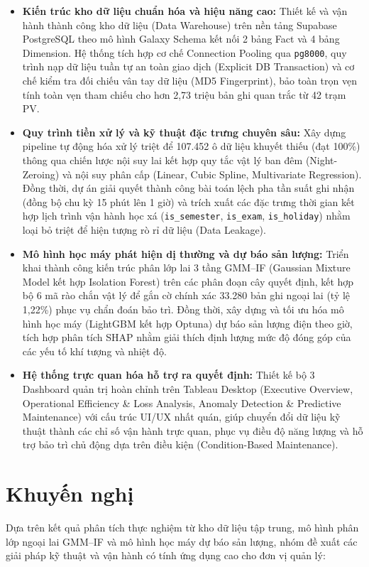 \documentclass[12pt, a4paper]{report}
\begin{document}
\begin{itemize}
    \item \textbf{Kiến trúc kho dữ liệu chuẩn hóa và hiệu năng cao:} Thiết kế và vận hành thành công kho dữ liệu (Data Warehouse) trên nền tảng Supabase PostgreSQL theo mô hình Galaxy Schema kết nối 2 bảng Fact và 4 bảng Dimension. Hệ thống tích hợp cơ chế Connection Pooling qua \texttt{pg8000}, quy trình nạp dữ liệu tuần tự an toàn giao dịch (Explicit DB Transaction) và cơ chế kiểm tra đối chiếu vân tay dữ liệu (MD5 Fingerprint), bảo toàn trọn vẹn tính toàn vẹn tham chiếu cho hơn 2,73 triệu bản ghi quan trắc từ 42 trạm PV.
    \item \textbf{Quy trình tiền xử lý và kỹ thuật đặc trưng chuyên sâu:} Xây dựng pipeline tự động hóa xử lý triệt để 107.452 ô dữ liệu khuyết thiếu (đạt 100\%) thông qua chiến lược nội suy lai kết hợp quy tắc vật lý ban đêm (Night-Zeroing) và nội suy phân cấp (Linear, Cubic Spline, Multivariate Regression). Đồng thời, dự án giải quyết thành công bài toán lệch pha tần suất ghi nhận (đồng bộ chu kỳ 15 phút lên 1 giờ) và trích xuất các đặc trưng thời gian kết hợp lịch trình vận hành học xá (\texttt{is\_semester}, \texttt{is\_exam}, \texttt{is\_holiday}) nhằm loại bỏ triệt để hiện tượng rò rỉ dữ liệu (Data Leakage).
    \item \textbf{Mô hình học máy phát hiện dị thường và dự báo sản lượng:} Triển khai thành công kiến trúc phân lớp lai 3 tầng GMM--IF (Gaussian Mixture Model kết hợp Isolation Forest) trên các phân đoạn cây quyết định, kết hợp bộ 6 mã rào chắn vật lý để gắn cờ chính xác 33.280 bản ghi ngoại lai (tỷ lệ 1,22\%) phục vụ chẩn đoán bảo trì. Đồng thời, xây dựng và tối ưu hóa mô hình học máy (LightGBM kết hợp Optuna) dự báo sản lượng điện theo giờ, tích hợp phân tích SHAP nhằm giải thích định lượng mức độ đóng góp của các yếu tố khí tượng và nhiệt độ.
    \item \textbf{Hệ thống trực quan hóa hỗ trợ ra quyết định:} Thiết kế bộ 3 Dashboard quản trị hoàn chỉnh trên Tableau Desktop (Executive Overview, Operational Efficiency \& Loss Analysis, Anomaly Detection \& Predictive Maintenance) với cấu trúc UI/UX nhất quán, giúp chuyển đổi dữ liệu kỹ thuật thành các chỉ số vận hành trực quan, phục vụ điều độ năng lượng và hỗ trợ bảo trì chủ động dựa trên điều kiện (Condition-Based Maintenance).
\end{itemize}

\section{Khuyến nghị}
\label{sec:recommendations}
Dựa trên kết quả phân tích thực nghiệm từ kho dữ liệu tập trung, mô hình phân lớp ngoại lai GMM--IF và mô hình học máy dự báo sản lượng, nhóm đề xuất các giải pháp kỹ thuật và vận hành có tính ứng dụng cao cho đơn vị quản lý:
\end{document}
